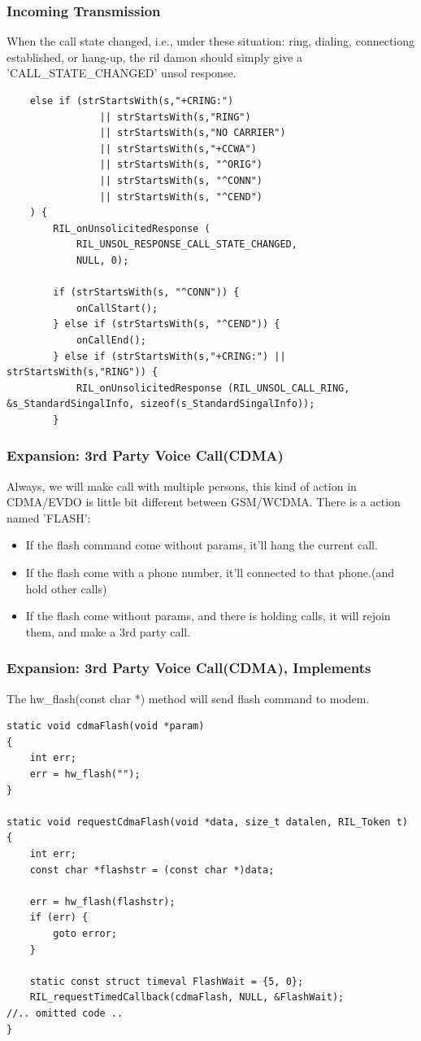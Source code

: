\documentclass{beamer}
\begin{document}
\begin{frame}[fragile]
    \frametitle{Incoming Transmission}
    When the call state changed, i.e., under these situation: ring, dialing, connectiong established, or hang-up, the ril damon should simply give a 'CALL\_STATE\_CHANGED' unsol response.
    \lstset{language=C}
  \begin{lstlisting}
    else if (strStartsWith(s,"+CRING:")
                || strStartsWith(s,"RING")
                || strStartsWith(s,"NO CARRIER")
                || strStartsWith(s,"+CCWA")
                || strStartsWith(s, "^ORIG")
                || strStartsWith(s, "^CONN")
                || strStartsWith(s, "^CEND")
    ) {
        RIL_onUnsolicitedResponse (
            RIL_UNSOL_RESPONSE_CALL_STATE_CHANGED,
            NULL, 0);

        if (strStartsWith(s, "^CONN")) {
            onCallStart();
        } else if (strStartsWith(s, "^CEND")) {
            onCallEnd();
        } else if (strStartsWith(s,"+CRING:") || strStartsWith(s,"RING")) {
            RIL_onUnsolicitedResponse (RIL_UNSOL_CALL_RING, &s_StandardSingalInfo, sizeof(s_StandardSingalInfo));
        }
  \end{lstlisting}
\end{frame}

\begin{frame}
    \frametitle{Expansion: 3rd Party Voice Call(CDMA)}
    Always, we will make call with multiple persons, this kind of action in CDMA/EVDO is little bit different between GSM/WCDMA. There is a action named 'FLASH':
    \begin{itemize}
        \item If the flash command come without params, it'll hang the current call.
        \item If the flash come with a phone number, it'll connected to that phone.(and hold other calls)
        \item If the flash come without params, and there is holding calls, it will rejoin them, and make a 3rd party call.
    \end{itemize}
\end{frame}
\begin{frame}[fragile]
    \frametitle{Expansion: 3rd Party Voice Call(CDMA), Implements}
    The hw\_flash(const char *) method will send flash command to modem.
    \lstset{language=C}
  \begin{lstlisting}
static void cdmaFlash(void *param)
{
    int err;
    err = hw_flash("");
}

static void requestCdmaFlash(void *data, size_t datalen, RIL_Token t)
{
    int err;
    const char *flashstr = (const char *)data;

    err = hw_flash(flashstr);
    if (err) {
        goto error;
    }

    static const struct timeval FlashWait = {5, 0};
    RIL_requestTimedCallback(cdmaFlash, NULL, &FlashWait);
//.. omitted code ..
}
   \end{lstlisting}
\end{frame}
\end{document}
